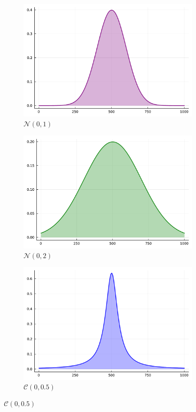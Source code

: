 \documentclass[10pt]{article}
\theoremstyle{plain}
\theoremstyle{remark}
\begin{document}
\begin{figure}[ht!]
        \begin{subfigure}[t]{0.5\textwidth}
                \centering
                \includegraphics[width=0.7\linewidth]{julia_figures/normal.pdf}
                \caption{$\mathcal{N}(0,1)$}
                \label{fig:normal}
        \end{subfigure}
        \begin{subfigure}[t]{0.5\textwidth}
                \centering
                \includegraphics[width=0.7\linewidth]{julia_figures/normal_wide.pdf}
                \caption{$\mathcal{N}(0,2)$}
                \label{fig:normal_wide}
        \end{subfigure}
        \begin{subfigure}[t]{1.0\textwidth}
                \centering
                \includegraphics[width=0.4\linewidth]{julia_figures/cauchy.pdf}

                \caption{$\mathcal{C}(0,0.5)$}
                \label{fig:cauchy_tight}
        \end{subfigure}
\end{figure}
\end{document}
